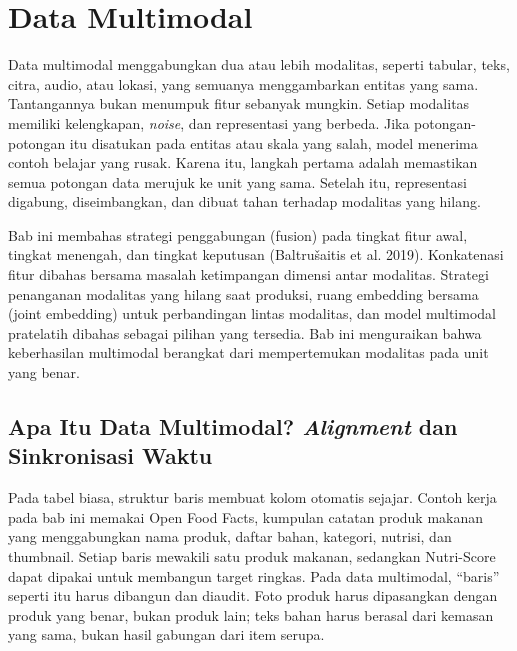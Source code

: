 \chapter{Data Multimodal}\label{data-multimodal}

Data multimodal menggabungkan dua atau lebih modalitas, seperti tabular, teks, citra, audio, atau lokasi, yang semuanya menggambarkan entitas yang sama. Tantangannya bukan menumpuk fitur sebanyak mungkin. Setiap modalitas memiliki kelengkapan, \emph{noise}, dan representasi yang berbeda. Jika potongan-potongan itu disatukan pada entitas atau skala yang salah, model menerima contoh belajar yang rusak. Karena itu, langkah pertama adalah memastikan semua potongan data merujuk ke unit yang sama. Setelah itu, representasi digabung, diseimbangkan, dan dibuat tahan terhadap modalitas yang hilang.

Bab ini membahas strategi penggabungan (fusion) pada tingkat fitur awal, tingkat menengah, dan tingkat keputusan (Baltrušaitis et al. 2019). Konkatenasi fitur dibahas bersama masalah ketimpangan dimensi antar modalitas. Strategi penanganan modalitas yang hilang saat produksi, ruang embedding bersama (joint embedding) untuk perbandingan lintas modalitas, dan model multimodal pratelatih dibahas sebagai pilihan yang tersedia. Bab ini menguraikan bahwa keberhasilan multimodal berangkat dari mempertemukan modalitas pada unit yang benar.

\section{\texorpdfstring{Apa Itu Data Multimodal? \emph{Alignment} dan Sinkronisasi Waktu}{Apa Itu Data Multimodal? Alignment dan Sinkronisasi Waktu}}\label{apa-itu-data-multimodal-alignment-dan-sinkronisasi-waktu}

Pada tabel biasa, struktur baris membuat kolom otomatis sejajar. Contoh kerja pada bab ini memakai Open Food Facts, kumpulan catatan produk makanan yang menggabungkan nama produk, daftar bahan, kategori, nutrisi, dan thumbnail. Setiap baris mewakili satu produk makanan, sedangkan Nutri-Score dapat dipakai untuk membangun target ringkas. Pada data multimodal, ``baris'' seperti itu harus dibangun dan diaudit. Foto produk harus dipasangkan dengan produk yang benar, bukan produk lain; teks bahan harus berasal dari kemasan yang sama, bukan hasil gabungan dari item serupa.

